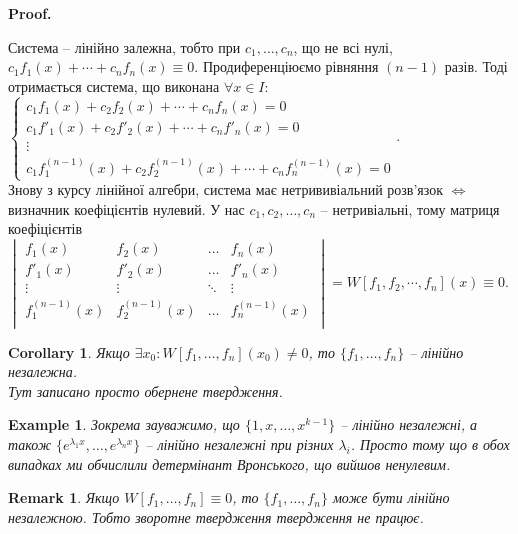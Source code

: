 \documentclass[a4paper, 10pt]{article}
\makeatletter
\def\qed{$\blacksquare$}
\theoremstyle{theoremdd}
\theoremstyle{theoremdd}
\theoremstyle{theoremdd}
\theoremstyle{theoremdd}
\newtheorem{example}[theorem]{Example}
\theoremstyle{theoremdd}
\theoremstyle{theoremdd}
\newtheorem{remark}[theorem]{Remark}
\theoremstyle{theoremdd}
\theoremstyle{theoremdd}
\newtheorem{corollary}[theorem]{Corollary}
\renewenvironment{proof}[1][Proof.\\]{\par
\pushQED{\hfill \qed}%
\normalfont \topsep6\p@\@plus6\p@\relax
\trivlist
\item\relax
{\bfseries
#1\@addpunct{.}}\hspace\labelsep\ignorespaces
}{%
\popQED\endtrivlist\@endpefalse
}
\makeatother
\begin{document}
	\begin{proof}
Система -- лінійно залежна, тобто при $c_1, \dots, c_n$, що не всі нулі, $c_1f_1(x) + \cdots + c_n f_n(x) \equiv 0$. Продиференціюємо рівняння $(n-1)$ разів. Тоді отримається система, що виконана $\forall x \in I$:\\
$\begin{cases}
c_1f_1(x) + c_2f_2(x) + \cdots + c_n f_n(x) = 0 \\
c_1f'_1(x) + c_2f'_2(x) + \cdots + c_n f'_n(x) = 0 \\
\vdots \\
c_1f^{(n-1)}_1(x) + c_2f^{(n-1)}_2(x) + \cdots + c_n f^{(n-1)}_n(x) = 0
\end{cases}
$.\\
Знову з курсу лінійної алгебри, система має нетрививіальний розв'язок $\iff$ визначник коефіцієнтів нулевий. У нас $c_1, c_2 ,\dots, c_n$ -- нетривіальні, тому матриця коефіцієнтів\\
$ \displaystyle 
\begin{vmatrix} 
	f_1(x) &  f_2(x) & \dots & f_n(x) \\ 
	f'_1(x) &  f'_2(x) & \dots & f'_n(x) \\
	\vdots &  \vdots & \ddots & \vdots \\
	f^{(n-1)}_1(x) &  f^{(n-1)}_2(x) & \dots & f^{(n-1)}_n(x) \\ 
\end{vmatrix} = W[f_1,f_2,\cdots,f_n](x) \equiv 0
$.
	\end{proof}

\begin{corollary}
\label{linear_independency_with_wronskian}
Якщо $\exists x_0: W[f_1,\dots,f_n](x_0) \neq 0$, то $\{f_1, \dots, f_n\}$ -- лінійно незалежна.\\
\textit{Тут записано просто обернене твердження.}
\end{corollary}

\begin{example}
Зокрема зауважимо, що $\{1,x,\dots,x^{k-1}\}$ -- лінійно незалежні, а також $\{e^{\lambda_1 x},\dots,e^{\lambda_n x}\}$ -- лінійно незалежні при різних $\lambda_i$. Просто тому що в обох випадках ми обчислили детермінант Вронського, що вийшов ненулевим.
\end{example}

\begin{remark}
Якщо $W[f_1,\dots, f_n] \equiv 0$, то $\{f_1, \dots, f_n\}$ може бути лінійно незалежною. Тобто зворотне твердження твердження не працює.
 \end{remark}
\end{document}
